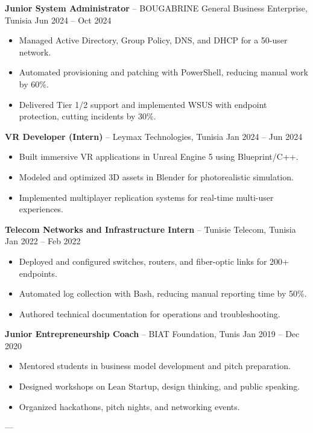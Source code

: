 \documentclass[a4paper,10pt]{article}
\begin{document}
\textbf{Junior System Administrator} -- BOUGABRINE General Business Enterprise, Tunisia \hfill Jun 2024 -- Oct 2024
\begin{itemize}[leftmargin=*]
    \item Managed Active Directory, Group Policy, DNS, and DHCP for a 50-user network.
    \item Automated provisioning and patching with PowerShell, reducing manual work by 60\%.
    \item Delivered Tier 1/2 support and implemented WSUS with endpoint protection, cutting incidents by 30\%.
\end{itemize}

\textbf{VR Developer (Intern)} -- Leymax Technologies, Tunisia \hfill Jan 2024 -- Jun 2024
\begin{itemize}[leftmargin=*]
    \item Built immersive VR applications in Unreal Engine 5 using Blueprint/C++.
    \item Modeled and optimized 3D assets in Blender for photorealistic simulation.
    \item Implemented multiplayer replication systems for real-time multi-user experiences.
\end{itemize}

\textbf{Telecom Networks and Infrastructure Intern} -- Tunisie Telecom, Tunisia \hfill Jan 2022 -- Feb 2022
\begin{itemize}[leftmargin=*]
    \item Deployed and configured switches, routers, and fiber-optic links for 200+ endpoints.
    \item Automated log collection with Bash, reducing manual reporting time by 50\%.
    \item Authored technical documentation for operations and troubleshooting.
\end{itemize}

\textbf{Junior Entrepreneurship Coach} -- BIAT Foundation, Tunis \hfill Jan 2019 -- Dec 2020
\begin{itemize}[leftmargin=*]
    \item Mentored students in business model development and pitch preparation.
    \item Designed workshops on Lean Startup, design thinking, and public speaking.
    \item Organized hackathons, pitch nights, and networking events.
\end{itemize}

---
\end{document}
